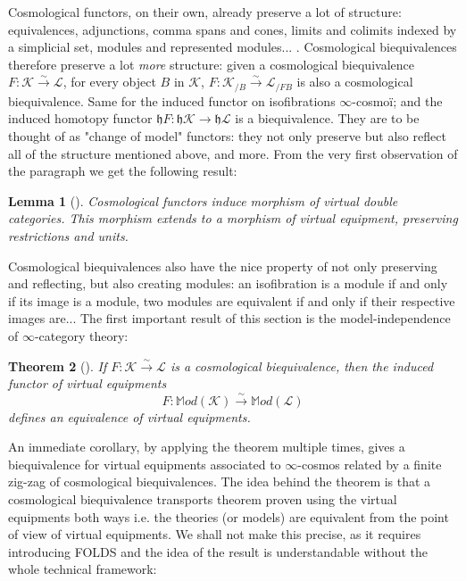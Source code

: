\documentclass[10pt,a4paper]{article}
\newcommand{\bb}[1]{\mathbb{#1}}
\newcommand{\ca}[1]{\mathcal{#1}}
\newcommand{\fk}[1]{\mathfrak{#1}}
\theoremstyle{plain}
\newtheorem{theorem}{Theorem}[subsection]
\newtheorem{lemma}[theorem]{Lemma}
\theoremstyle{definition}
\theoremstyle{remark}
\begin{document}
Cosmological functors, on their own, already preserve a lot of structure: equivalences, adjunctions, comma spans and cones, limits and colimits indexed by a simplicial set, modules and represented modules... \cite[Proposition 10.1.4]{riehl_verity}. Cosmological biequivalences therefore preserve a lot \textit{more} structure: given a cosmological biequivalence $F : \ca K \xrightarrow{\sim} \ca L$, for every object $B$ in $\ca K$, $F : \ca K_{/B} \xrightarrow{\sim} \ca L_{/FB}$ is also a cosmological biequivalence. Same for the induced functor on isofibrations $\infty$-cosmoï; and the induced homotopy functor $\fk hF : \fk h\ca K \to \fk h \ca L$ is a biequivalence. They are to be thought of as "change of model" functors: they not only preserve but also reflect all of the structure mentioned above, and more. From the very first observation of the paragraph we get the following result:

\begin{lemma}[{\cite[Lemma 11.1.1 and Proposition 11.1.2]{riehl_verity}}]
    Cosmological functors induce morphism of virtual double categories. This morphism extends to a morphism of virtual equipment, preserving restrictions and units.
\end{lemma}

Cosmological biequivalences also have the nice property of not only preserving and reflecting, but also creating modules: an isofibration is a module if and only if its image is a module, two modules are equivalent if and only if their respective images are... The first important result of this section is the model-independence of $\infty$-category theory:

\begin{theorem}[{\cite[Theorem 11.1.6]{riehl_verity}}]
    If $F : \ca K \xrightarrow{\sim} \ca L$ is a cosmological biequivalence, then the induced functor of virtual equipments
    \[
        F : \bb Mod(\ca K) \xrightarrow{\sim} \bb Mod(\ca L)
    \]
    defines an equivalence of virtual equipments.
\end{theorem}

An immediate corollary, by applying the theorem multiple times, gives a biequivalence for virtual equipments associated to $\infty$-cosmos related by a finite zig-zag of cosmological biequivalences. The idea behind the theorem is that a cosmological biequivalence transports theorem proven using the virtual equipments both ways i.e. the theories (or models) are equivalent from the point of view of virtual equipments. We shall not make this precise, as it requires introducing FOLDS and the idea of the result is understandable without the whole technical framework:
\end{document}
